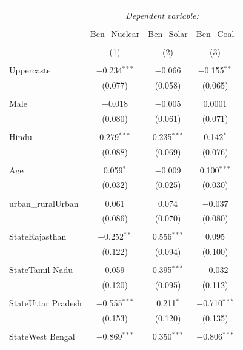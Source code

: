 \documentclass[
]{article}
\begin{document}
\begin{table}[!htbp] \centering 
  \caption{} 
  \label{} 
\begin{tabular}{@{\extracolsep{5pt}}lccc} 
\\[-1.8ex]\hline 
\hline \\[-1.8ex] 
 & \multicolumn{3}{c}{\textit{Dependent variable:}} \\ 
\cline{2-4} 
\\[-1.8ex] & Ben\_Nuclear & Ben\_Solar & Ben\_Coal \\ 
\\[-1.8ex] & (1) & (2) & (3)\\ 
\hline \\[-1.8ex] 
 Uppercaste & $-$0.234$^{***}$ & $-$0.066 & $-$0.155$^{**}$ \\ 
  & (0.077) & (0.058) & (0.065) \\ 
  & & & \\ 
 Male & $-$0.018 & $-$0.005 & 0.0001 \\ 
  & (0.080) & (0.061) & (0.071) \\ 
  & & & \\ 
 Hindu & 0.279$^{***}$ & 0.235$^{***}$ & 0.142$^{*}$ \\ 
  & (0.088) & (0.069) & (0.076) \\ 
  & & & \\ 
 Age & 0.059$^{*}$ & $-$0.009 & 0.100$^{***}$ \\ 
  & (0.032) & (0.025) & (0.030) \\ 
  & & & \\ 
 urban\_ruralUrban & 0.061 & 0.074 & $-$0.037 \\ 
  & (0.086) & (0.070) & (0.080) \\ 
  & & & \\ 
 StateRajasthan & $-$0.252$^{**}$ & 0.556$^{***}$ & 0.095 \\ 
  & (0.122) & (0.094) & (0.100) \\ 
  & & & \\ 
 StateTamil Nadu & 0.059 & 0.395$^{***}$ & $-$0.032 \\ 
  & (0.120) & (0.095) & (0.112) \\ 
  & & & \\ 
 StateUttar Pradesh & $-$0.555$^{***}$ & 0.211$^{*}$ & $-$0.710$^{***}$ \\ 
  & (0.153) & (0.120) & (0.135) \\ 
  & & & \\ 
 StateWest Bengal & $-$0.869$^{***}$ & 0.350$^{***}$ & $-$0.806$^{***}$ \\ 

\end{tabular}
\end{table}
\end{document}
